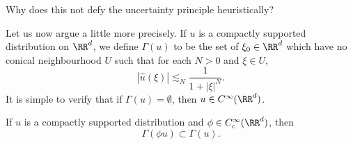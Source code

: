 \begin{remark}
  Why does this not defy the uncertainty principle heuristically?
\end{remark}

Let us now argue a little more precisely. If $u$ is a compactly supported distribution on $\RR^d$, we define $\Gamma(u)$ to be the set of $\xi_0 \in \RR^d$ which have no conical neighbourhood $U$ such that for each $N > 0$ and $\xi \in U$,
%
\begin{equation} \label{fastDecayEquation}
  |\widehat{u}(\xi)| \lesssim_N \frac{1}{1 + |\xi|^N}.
\end{equation}
%
It is simple to verify that if $\Gamma(u) = \emptyset$, then $u \in C^\infty(\RR^d)$.

\begin{lemma} \label{wavefrontlocalizationlemma}
  If $u$ is a compactly supported distribution and $\phi \in C_c^\infty(\RR^d)$, then
  \[ \Gamma(\phi u) \subset \Gamma(u). \]
\end{lemma}
